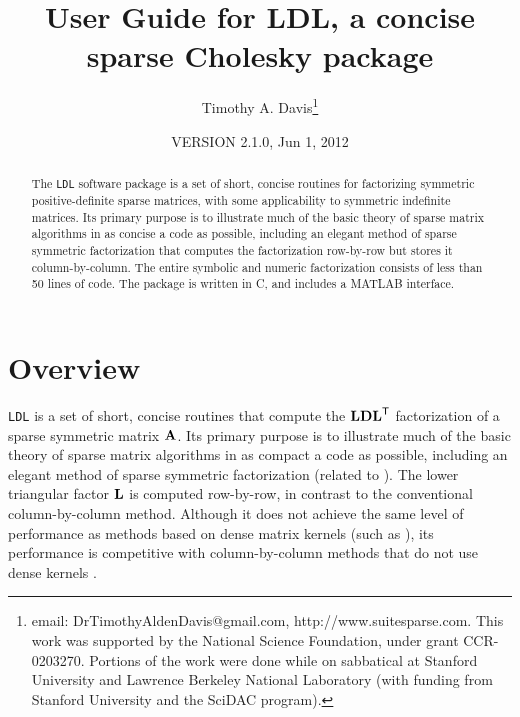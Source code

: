 \documentclass[12pt]{article}
\newcommand{\m}[1]{{\bf{#1}}}       %
\newcommand{\tr}{^{\sf T}}          %
\begin{document}

\title{User Guide for LDL, a concise sparse Cholesky package}
\author{Timothy A. Davis\thanks{
email: DrTimothyAldenDavis@gmail.com,
http://www.suitesparse.com.
This work was supported by the National
Science Foundation, under grant CCR-0203270.
Portions of the work were done while on sabbatical at Stanford University
and Lawrence Berkeley National Laboratory (with funding from Stanford
University and the SciDAC program).
}}

\date{VERSION 2.1.0, Jun 1, 2012}

\maketitle

\begin{abstract}
The {\tt LDL} software package is a set of short, concise routines for
factorizing symmetric positive-definite sparse matrices, with some
applicability to symmetric indefinite matrices.  Its primary purpose is
to illustrate much of the basic theory of sparse matrix algorithms in as
concise a code as possible, including an elegant method
of sparse symmetric factorization that computes the factorization row-by-row
but stores it column-by-column.  The entire symbolic and numeric factorization
consists of less than 50 lines of code.  The package is written in C,
and includes a MATLAB interface.
\end{abstract}

\section{Overview}

{\tt LDL} is a set of short, concise routines that compute the $\m{LDL}\tr$
factorization of a sparse symmetric matrix $\m{A}$.  Its primary purpose is
to illustrate much of the basic theory of sparse matrix algorithms in as
compact a code as possible, including an elegant method of
sparse symmetric factorization (related to \cite{Liu86c,Liu91}).
The lower triangular factor $\m{L}$ is computed row-by-row, in contrast to the
conventional column-by-column method.
Although it does not achieve the same level of performance
as methods based on dense matrix kernels
(such as \cite{NgPeyton93,RothbergGupta91}),
its performance is competitive with column-by-column methods that do not
use dense kernels \cite{GeorgeLiu79, GeorgeLiu, GilbertMolerSchreiber}.
\end{document}
